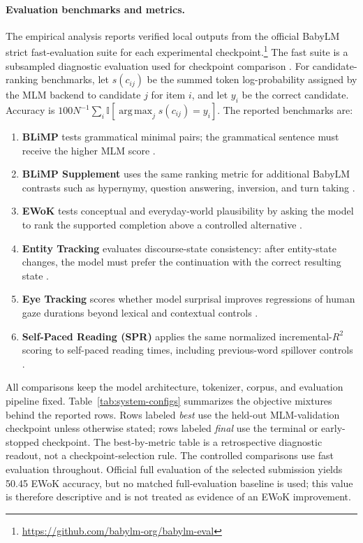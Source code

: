 \documentclass[11pt]{article}
\begin{document}
\paragraph{Evaluation benchmarks and metrics.}
The empirical analysis reports verified local outputs from the official BabyLM strict fast-evaluation suite for each experimental checkpoint.\footnote{\url{https://github.com/babylm-org/babylm-eval}}
The fast suite is a subsampled diagnostic evaluation used for checkpoint comparison \citep{warstadt2023babylm}.
For candidate-ranking benchmarks, let $s(c_{ij})$ be the summed token log-probability assigned by the MLM backend to candidate $j$ for item $i$, and let $y_i$ be the correct candidate.
Accuracy is $100N^{-1}\sum_i \mathbb{I}[\operatorname*{arg\,max}_j s(c_{ij})=y_i]$.
The reported benchmarks are:
\begin{enumerate}
  \setlength{\itemsep}{0pt}
  \setlength{\parsep}{0pt}
  \setlength{\topsep}{1pt}
  \item \textbf{BLiMP} tests grammatical minimal pairs; the grammatical sentence must receive the higher MLM score \citep{warstadt2020blimp}.
  \item \textbf{BLiMP Supplement} uses the same ranking metric for additional BabyLM contrasts such as hypernymy, question answering, inversion, and turn taking \citep{warstadt2023babylm}.
  \item \textbf{EWoK} tests conceptual and everyday-world plausibility by asking the model to rank the supported completion above a controlled alternative \citep{ivanova2025ewok}.
  \item \textbf{Entity Tracking} evaluates discourse-state consistency: after entity-state changes, the model must prefer the continuation with the correct resulting state \citep{kim2023entity}.
  \item \textbf{Eye Tracking} scores whether model surprisal improves regressions of human gaze durations beyond lexical and contextual controls \citep{devarda2024cloze}.
  \item \textbf{Self-Paced Reading (SPR)} applies the same normalized incremental-$R^2$ scoring to self-paced reading times, including previous-word spillover controls \citep{frank2013reading}.
\end{enumerate}
All comparisons keep the model architecture, tokenizer, corpus, and evaluation pipeline fixed.
Table~\ref{tab:system-configs} summarizes the objective mixtures behind the reported rows.
Rows labeled \textit{best} use the held-out MLM-validation checkpoint unless otherwise stated; rows labeled \textit{final} use the terminal or early-stopped checkpoint.
The best-by-metric table is a retrospective diagnostic readout, not a checkpoint-selection rule.
The controlled comparisons use fast evaluation throughout. Official full evaluation of the selected submission yields 50.45 EWoK accuracy, but no matched full-evaluation baseline is used; this value is therefore descriptive and is not treated as evidence of an EWoK improvement.
\end{document}
